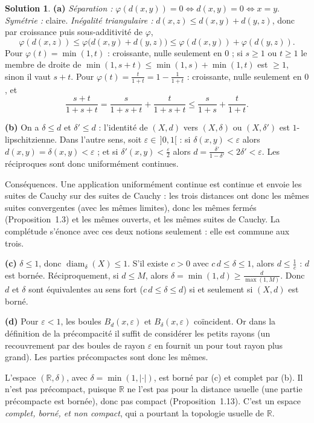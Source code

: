 \documentclass[11pt,a4paper]{article}
\newcommand{\R}{\mathbb{R}}
\newcommand{\diam}{\operatorname{diam}}
\theoremstyle{definition}
\newtheorem*{solution}{Solution}
\begin{document}
\begin{solution}
\noindent\textbf{(a)} \emph{Séparation :} $\varphi(d(x,y))=0\iff d(x,y)=0\iff x=y$. \emph{Symétrie :} claire. \emph{Inégalité triangulaire :} $d(x,z)\le d(x,y)+d(y,z)$, donc par croissance puis sous-additivité de $\varphi$,
\[
\varphi(d(x,z))\le\varphi\big(d(x,y)+d(y,z)\big)\le\varphi(d(x,y))+\varphi(d(y,z)) .
\]
Pour $\varphi(t)=\min(1,t)$ : croissante, nulle seulement en $0$ ; si $s\ge1$ ou $t\ge1$ le membre de droite de $\min(1,s+t)\le\min(1,s)+\min(1,t)$ est $\ge1$, sinon il vaut $s+t$. Pour $\varphi(t)=\frac t{1+t}=1-\frac1{1+t}$ : croissante, nulle seulement en $0$, et
\[
\frac{s+t}{1+s+t}=\frac s{1+s+t}+\frac t{1+s+t}\le\frac s{1+s}+\frac t{1+t} .
\]

\medskip
\noindent\textbf{(b)} On a $\delta\le d$ et $\delta'\le d$ : l'identité de $(X,d)$ vers $(X,\delta)$ ou $(X,\delta')$ est $1$-lipschitzienne. Dans l'autre sens, soit $\varepsilon\in\,]0,1[$ : si $\delta(x,y)<\varepsilon$ alors $d(x,y)=\delta(x,y)<\varepsilon$ ; et si $\delta'(x,y)<\frac\varepsilon2$ alors $d=\frac{\delta'}{1-\delta'}<2\delta'<\varepsilon$. Les réciproques sont donc uniformément continues.

Conséquences. Une application uniformément continue est continue et envoie les suites de Cauchy sur des suites de Cauchy : les trois distances ont donc les mêmes suites convergentes (avec les mêmes limites), donc les mêmes fermés (Proposition~1.3) et les mêmes ouverts, et les mêmes suites de Cauchy. La complétude s'énonce avec ces deux notions seulement : elle est commune aux trois.

\medskip
\noindent\textbf{(c)} $\delta\le1$, donc $\diam_\delta(X)\le1$. S'il existe $c>0$ avec $c\,d\le\delta\le1$, alors $d\le\frac1c$ : $d$ est bornée. Réciproquement, si $d\le M$, alors $\delta=\min(1,d)\ge\frac d{\max(1,M)}$. Donc $d$ et $\delta$ sont équivalentes au sens fort ($c\,d\le\delta\le d$) si et seulement si $(X,d)$ est borné.

\medskip
\noindent\textbf{(d)} Pour $\varepsilon<1$, les boules $B_d(x,\varepsilon)$ et $B_\delta(x,\varepsilon)$ coïncident. Or dans la définition de la précompacité il suffit de considérer les petits rayons (un recouvrement par des boules de rayon $\varepsilon$ en fournit un pour tout rayon plus grand). Les parties précompactes sont donc les mêmes.

L'espace $(\R,\delta)$, avec $\delta=\min(1,|\cdot|)$, est borné par (c) et complet par (b). Il n'est pas précompact, puisque $\R$ ne l'est pas pour la distance usuelle (une partie précompacte est bornée), donc pas compact (Proposition~1.13). C'est un espace \emph{complet, borné, et non compact}, qui a pourtant la topologie usuelle de $\R$.
\end{solution}
\end{document}

